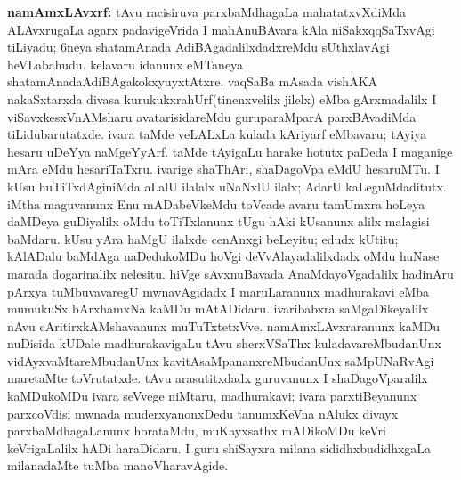 {\large\textbf{namAmxLAvxrf:}} tAvu racisiruva parxbaMdhagaLa mahatatxvXdiMda ALAvxrugaLa agarx padavi\-geVrida I mahAnuBAvara kAla niSakxqqSaTxvAgi tiLiyadu; {\rm 6}neya shatamAnada Adi\-BAgadalilxdadxreMdu sUthxlavAgi heVLabahudu. kelavaru idanunx eMTaneya shatamAnada\break AdiBAgakokxyuyxtAtxre. vaqSaBa mAsada vishAKA nakaSxtarxda divasa kurukukxrahUrf\break (tinenxvelilx jilelx) eMba gArxmadalilx I viSavxkesxVnAMsharu avatarisidareMdu guru\-paraMparA parxBAvadiMda tiLidubarutatxde. ivara taMde veLALxLa kulada kAriyarf eMbavaru; tAyiya hesaru uDeYya naMgeYyArf. taMde tAyigaLu harake hotutx paDeda I maganige mAra eMdu hesariTaTxru. ivarige shaThAri, shaDagoVpa eMdU hesaruMTu. I kUsu huTiTxdAginiMda aLalU ilalalx uNaNxlU ilalx; AdarU kaLeguMdaditutx. iMtha maguvanunx Enu mADabeVkeMdu toVcade avaru tamUmxra hoLeya daMDeya guDiyalilx oMdu toTiTxlanunx tUgu hAki kUsanunx alilx malagisi baMdaru. kUsu yAra haMgU ilalxde cenAnxgi beLeyitu; edudx kUtitu; kAlADalu baMdAga naDedukoMDu hoVgi deVvAlayadalilxdadx oMdu huNase marada dogarinalilx nelesitu. hiVge sAvxnuBavada AnaMdayoVgadalilx hadinAru pArxya tuMbuvavaregU mwnavAgidadx I maruLaranunx madhurakavi eMba mumukuSx bArxhamxNa kaMDu mAtADidaru. ivaribabxra saMgaDikeyalilx nAvu cAritirxkAMshavanunx muTuTxtetxVve. namAmxLAvxraranunx kaMDu nuDisida kUDale madhurakavigaLu tAvu sherxVSaThx kuladavareMbudanUnx vidAyxvaMtareMbudanUnx kavitAsaMpananxreMbudanUnx saMpUNaRvAgi maretaMte toVrutatxde. tAvu arasutitxdadx guruvanunx I shaDagoVparalilx kaMDukoMDu ivara seVvege niMtaru, madhurakavi; ivara parxtiBeyanunx parxcoVdisi mwnada muderxyanonxDedu tanumxKeVna nAlukx divayx parxbaMdhagaLanunx horataMdu, muKayxsathx mADikoMDu keVri keVrigaLalilx hADi haraDidaru. I guru shiSayxra milana sididhxbudidhxgaLa milanadaMte tuMba manoVharavAgide.

